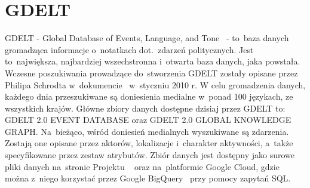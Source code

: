 \documentclass[11pt]{report}
\begin{document}
    \section{GDELT}\label{sec:gdelt}
    GDELT - Global Database of Events, Language, and Tone~\cite{gdelt} - to~baza danych gromadząca informacje o~notatkach dot.~zdarzeń politycznych.
    Jest to~największa, najbardziej wszechstronna i~otwarta baza danych, jaka powstała.
    Wczesne poszukiwania prowadzące do~stworzenia GDELT zostały opisane przez Philipa Schrodta w~dokumencie~\cite{Schrodt2010} w~styczniu 2010 r.
    W celu gromadzenia danych, każdego dnia przeszukiwane są doniesienia medialne w~ponad 100 językach, ze wszystkich krajów.
    Główne zbiory danych dostępne dzisiaj przez GDELT to:
    GDELT 2.0 EVENT DATABASE oraz
    GDELT 2.0 GLOBAL KNOWLEDGE GRAPH\@.
    Na~bieżąco, wśród doniesień medialnych wyszukiwane są zdarzenia.
    Zostają one opisane przez aktorów, lokalizacje i~charakter aktywności, a~także specyfikowane przez zestaw atrybutów.
    Zbiór danych jest dostępny jako surowe pliki danych na~stronie Projektu ~\cite{gdelt}
    oraz na~platformie Google Cloud, gdzie można z~niego korzystać przez Google BigQuery~\cite{BigQuery2014} przy pomocy zapytań SQL\@.
\end{document}
